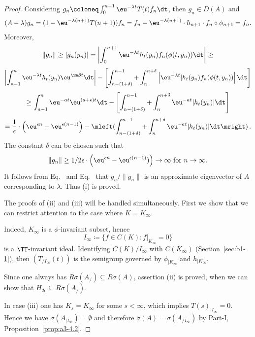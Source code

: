 \begin{proof}
	Considering $g_{n}\coloneq \int_{0}^{n+1} \eu^{-\lambda t} T(t)f_{n} \dt$, then $g_{n} \in D(A)$ and
	\begin{equation}\label{eq:b3-4.7}
		(A - \lambda)g_{n} = (1 - \eu^{-\lambda(n+1)}T(n+1))f_{n} = f_{n} - \eu^{-\lambda(n+1)} \cdot h_{n+1} \cdot f_{n} \circ \phi_{n+1} = f_{n}.
	\end{equation}
	Moreover,
	\[\|g_{n}\| \geq |g_{n}(y_{n})| = \left|\int_{0}^{n+1} \eu^{-\lambda t} h_{t}(y_{n})f_{n}(\phi(t,y_{n})) \dt \right| \geq\]
	\[\left|\int_{n-1}^{n} \eu^{-\lambda t} h_{t}(y_{n}) \eu^{\im\beta  t} \dt\right| - \left[\int_{n-(1+\delta)}^{n-1} + \int_{n}^{n+\delta}\left| \eu^{-\lambda t}|h_{t}(y_{n})f_{n}(\phi(t,y_{n}))\right| \dt\right]\]
	\[\geq \int_{n-1}^{n} \eu^{-at} \eu^{(a+\epsilon)t} \dt - \left[\int_{n-(1+\delta)}^{n-1} + \int_{n}^{n+\delta} \eu^{-at}|h_{t}(y_{n})| \dt\right]\]
	\[
    = \frac{1}{\epsilon}\cdot\left(\eu^{\epsilon n} - \eu^{\epsilon(n-1)}\right) - \mleft(\int_{n-(1+\delta)}^{n-1} + \int_{n}^{n+\delta} \eu^{-at}|h_{t}(y_{n})| \dt\mright)\,.
    \]
	The constant $\delta$ can be chosen such that
	\begin{equation}\label{eq:b3-4.8}
		\|g_{n}\| \geq 1/2\epsilon \cdot\left(\eu^{\epsilon n} - \eu^{\epsilon(n-1)})\right) \to \infty \text{ for } n \to \infty.
	\end{equation}
	It follows from Eq.~ and Eq.~ that $ g_n / \|g_n\|$ is an approximate
	eigenvector of\/ $A$ corresponding to $\lambda$. 
    Thus (i) is proved. 
	
	The 
	proofs of (ii) and (iii) will be handled simultaneously. 
    First we show that we can restrict attention to the case where $K = K_\infty$.
	
	Indeed, $K_{\infty}$ is a $\phi$-invariant subset, hence \[
    I_{\infty}\coloneq \{f \in C(K) \colon f|_{K_{\infty}} = 0\}
    \]
    is a $\TT$-invariant ideal.
	Identifying $C(K)/I_{\infty}$ with $C(K_{\infty})$ (\cf Section~\ref{sec:b1-1}), then $(T_{/I_{\infty}}(t))$ is the semigroup governed by $\phi_{|K_{\infty}}$ and $h_{|K_{\infty}}$.
    
	Since one always has $R{\sigma}(A_{/}) \subseteq R{\sigma}(A)$, assertion (ii) is proved, 
	when we can show that $H_{2\epsilon} \subseteq R{\sigma}(A_{/})$.
    
	In case (iii) one has $K_{s} = K_{\infty}$ for some $s < \infty$, which implies $T(s)_{|I_{\infty}} = 0$.
	Hence we have $\sigma(A_{|I_{\infty}}) = \emptyset$ and therefore $\sigma(A) = \sigma(A_{/I_{\infty}})$ by Part-I, Proposition~\ref{prop:a3-4.2}.
	

\end{proof}
